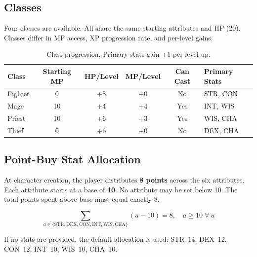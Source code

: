 \documentclass[a4paper,10pt]{article}
\newcommand{\stat}[1]{\textsc{#1}}
\begin{document}
\subsection{Classes}

Four classes are available. All share the same starting attributes and HP
(20). Classes differ in MP access, XP progression rate, and per-level gains.

\begin{table}[h]
\centering
\begin{tabular}{@{}lccccl@{}}
\toprule
\textbf{Class} & \textbf{Starting MP} & \textbf{HP/Level} & \textbf{MP/Level} & \textbf{Can Cast} & \textbf{Primary Stats} \\
\midrule
Fighter & 0  & +8 & +0 & No  & \stat{STR}, \stat{CON} \\
Mage    & 10 & +4 & +4 & Yes & \stat{INT}, \stat{WIS} \\
Priest  & 10 & +6 & +3 & Yes & \stat{WIS}, \stat{CHA} \\
Thief   & 0  & +6 & +0 & No  & \stat{DEX}, \stat{CHA} \\
\bottomrule
\end{tabular}
\caption{Class progression. Primary stats gain +1 per level-up.}
\label{tab:classes}
\end{table}

\subsection{Point-Buy Stat Allocation}

At character creation, the player distributes \textbf{8 points} across
the six attributes. Each attribute starts at a base of \textbf{10}. No
attribute may be set below 10. The total points spent above base must
equal exactly 8.

\[
  \sum_{a \in \{\text{STR}, \text{DEX}, \text{CON}, \text{INT}, \text{WIS}, \text{CHA}\}}
    (a - 10) = 8, \quad a \geq 10 \;\forall\; a
\]

If no stats are provided, the default allocation is used:
\stat{STR}~14, \stat{DEX}~12, \stat{CON}~12, \stat{INT}~10, \stat{WIS}~10, \stat{CHA}~10.
\end{document}
